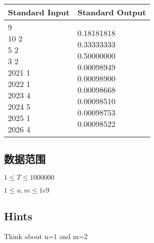 \begin{table}[H]
\begin{tabularx}{\textwidth}{|X|X|}
    \hline
    \textbf{Standard Input} & \textbf{Standard Output} \\ 
    \hline 
    \tablecell{
        9 \\
    10 2 \\
    5 2 \\
    3 2 \\
    2021 1 \\
    2022 1 \\
    2023 4 \\
    2024 5 \\
    2025 1 \\
    2026 4 \\
    } & 
    \tablecell{0.18181818  \\
    0.33333333 \\
    0.50000000 \\
    0.00098949 \\
    0.00098900 \\
    0.00098668 \\
    0.00098510 \\
    0.00098753 \\
    0.00098522 \\} \\
    \hline
\end{tabularx}
\end{table}
\subsection*{数据范围}
$1 \leq T \leq 1000000$

$1 \leq n,m \leq 1e9$
\subsection*{Hints}
Think about n=1 and m=2
